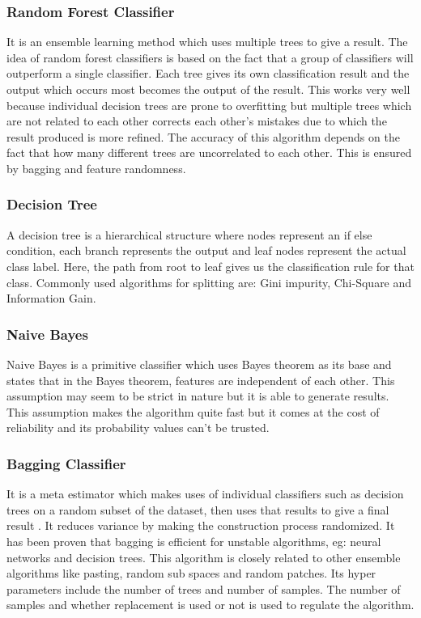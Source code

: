 \subsubsection{Random Forest Classifier}
\label{subsubsection:randomForestClassifier}
It is an ensemble learning method which uses multiple trees to give a result\cite{article:randomForest}. The idea of random forest classifiers is based on the fact that a group of classifiers will outperform a single classifier. Each tree gives its own classification result and the output which occurs most becomes the output of the result. This works very well because individual decision trees are prone to overfitting but multiple trees which are not related to each other corrects each other's mistakes due to which the result produced is more refined. The accuracy of this algorithm depends on the fact that how many different trees are uncorrelated to each other. This is ensured by bagging and feature randomness.

\subsubsection{Decision Tree}
\label{subsubsection:decisionTree}
A decision tree is a hierarchical structure where nodes represent an if else condition, each branch represents the output and leaf nodes represent the actual class label\cite{article:decisionTree}. Here, the path from root to leaf gives us the classification rule for that class. Commonly used algorithms for splitting are: Gini impurity, Chi-Square and Information Gain.

\subsubsection{Naive Bayes}
\label{subsubsection:naiveBayes}
Naive Bayes is a primitive classifier which uses Bayes theorem as its base and states that in the Bayes theorem, features are independent of each other\cite{article:naiveBayes}. This assumption may seem to be strict in nature but it is able to generate results. This assumption makes the algorithm quite fast but it comes at the cost of reliability and its probability values can't be trusted.  

\subsubsection{Bagging Classifier}
\label{subsubsection:baggingClassifier}
It is a meta estimator which makes uses of individual classifiers such as decision trees on a random subset of the dataset, then uses that results to give a final result \cite{article:baggingClassifier}. It reduces variance by making the construction process randomized. It has been proven that bagging is efficient for unstable algorithms, eg: neural networks and decision trees. This algorithm is closely related to other ensemble algorithms like pasting, random sub spaces and random patches. Its hyper parameters include the number of trees and number of samples. The number of samples and whether replacement is used or not is used to regulate the algorithm.


